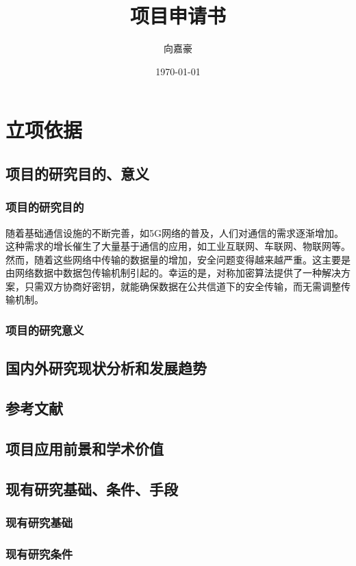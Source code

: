 \documentclass{ctexart}
\begin{document}
\title{项目申请书}
\author{向嘉豪}
\date{\today}

\maketitle


\section{立项依据}
\subsection{项目的研究目的、意义}

\subsubsection{项目的研究目的}
随着基础通信设施的不断完善，如5G网络的普及，人们对通信的需求逐渐增加。这种需求的增长催生了大量基于通信的应用，如工业互联网、车联网、物联网等。
然而，随着这些网络中传输的数据量的增加，安全问题变得越来越严重。这主要是由网络数据中数据包传输机制引起的。幸运的是，对称加密算法提供了一种解决方案，只需双方协商好密钥，就能确保数据在公共信道下的安全传输，而无需调整传输机制。

\subsubsection{项目的研究意义}

\subsection{国内外研究现状分析和发展趋势}

\subsection{参考文献}
\subsection{项目应用前景和学术价值}
\subsection{现有研究基础、条件、手段}
\subsubsection{现有研究基础}
\subsubsection{现有研究条件}
\end{document}

